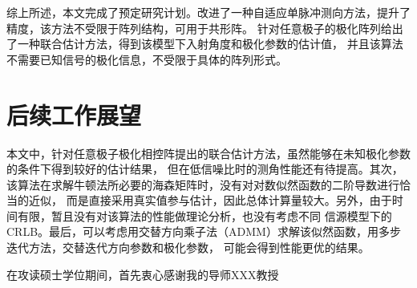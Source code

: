 \documentclass[master]{thesis-uestc}
\begin{document}
综上所述，本文完成了预定研究计划。改进了一种自适应单脉冲测向方法，提升了精度，该方法不受限于阵列结构，可用于共形阵。
针对任意极子的极化阵列给出了一种联合估计方法，得到该模型下入射角度和极化参数的估计值，
并且该算法不需要已知信号的极化信息，不受限于具体的阵列形式。

\section{后续工作展望}
本文中，针对任意极子极化相控阵提出的联合估计方法，虽然能够在未知极化参数的条件下得到较好的估计结果，
但在低信噪比时的测角性能还有待提高。其次，该算法在求解牛顿法所必要的海森矩阵时，没有对对数似然函数的二阶导数进行恰当的近似，
而是直接采用真实值参与估计，因此总体计算量较大。另外，由于时间有限，暂且没有对该算法的性能做理论分析，也没有考虑不同
信源模型下的CRLB。最后，可以考虑用交替方向乘子法（ADMM）求解该似然函数，用多步迭代方法，交替迭代方向参数和极化参数，
可能会得到性能更优的结果。

\thesisacknowledgement
在攻读硕士学位期间，首先衷心感谢我的导师XXX教授








% 

% 
% 



\end{document}
